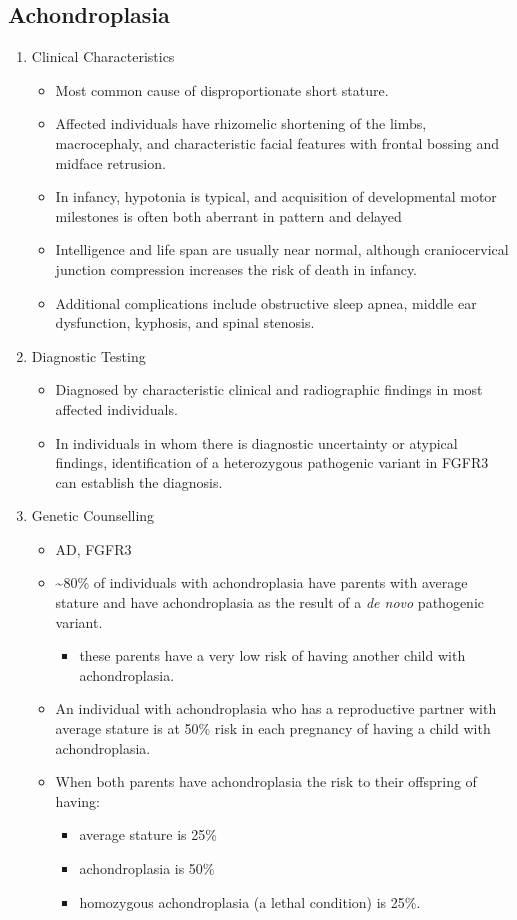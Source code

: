 \documentclass[12pt]{scrartcl}
\begin{document}
\subsection{Achondroplasia}
\label{sec:org6bfcc06}
\begin{enumerate}
\item Clinical Characteristics
\label{sec:org1f7e141}
\begin{itemize}
\item Most common cause of disproportionate short stature.
\item Affected individuals have rhizomelic shortening of the limbs,
macrocephaly, and characteristic facial features with frontal
bossing and midface retrusion.
\item In infancy, hypotonia is typical, and acquisition of developmental
motor milestones is often both aberrant in pattern and delayed
\item Intelligence and life span are usually near normal, although
craniocervical junction compression increases the risk of death in
infancy.
\item Additional complications include obstructive sleep apnea, middle ear
dysfunction, kyphosis, and spinal stenosis.
\end{itemize}

\item Diagnostic Testing
\label{sec:orgf3725b7}
\begin{itemize}
\item Diagnosed by characteristic clinical and radiographic findings in
most affected individuals.
\item In individuals in whom there is diagnostic uncertainty or atypical
findings, identification of a heterozygous pathogenic variant in
FGFR3 can establish the diagnosis.
\end{itemize}

\item Genetic Counselling
\label{sec:org0a5aba0}
\begin{itemize}
\item AD, FGFR3
\item \textasciitilde{}80\% of individuals with achondroplasia have parents with average
stature and have achondroplasia as the result of a \emph{de novo}
pathogenic variant.
\begin{itemize}
\item these parents have a very low risk of having another child with
achondroplasia.
\end{itemize}
\item An individual with achondroplasia who has a reproductive partner
with average stature is at 50\% risk in each pregnancy of having a
child with achondroplasia.
\item When both parents have achondroplasia the risk to their offspring of
having:
\begin{itemize}
\item average stature is 25\%
\item achondroplasia is 50\%
\item homozygous achondroplasia (a lethal condition) is 25\%.
\end{itemize}


\end{itemize}
\end{enumerate}
\end{document}
